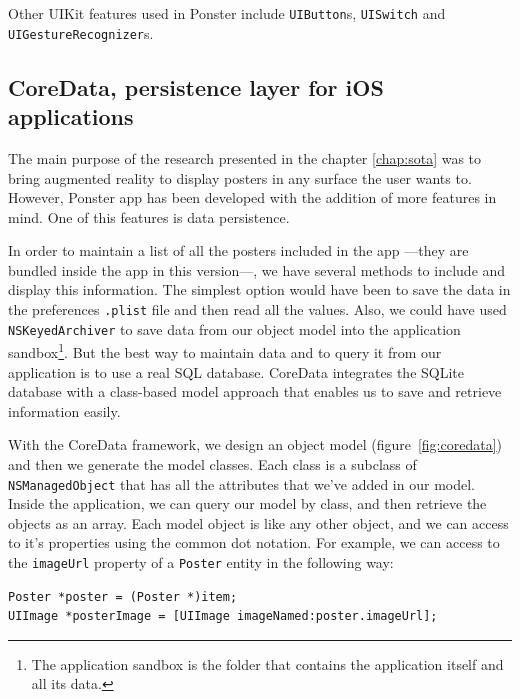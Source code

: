 Other UIKit features used in Ponster include \texttt{UIButton}s, \texttt{UISwitch}
and \texttt{UIGestureRecognizer}s. 

\subsection{CoreData, persistence layer for iOS applications}
The main purpose of the research presented in the chapter \ref{chap:sota} was to
bring augmented reality to display posters in any surface the user wants
to. However, Ponster app has been developed with the addition of more features in
mind. One of this features is data persistence.

In order to maintain a list of all the posters included in the app ---they are bundled
inside the app in this version---, we have several methods to include and display
this information. The simplest option would have been to save the data in the preferences
\texttt{.plist} file and then read all the values. Also, we could have used
\texttt{NSKeyedArchiver} to save data from our object model into the application
sandbox\footnote{The application sandbox is the folder that contains the application
itself and all its data.}. But the best way to maintain data and to
query it from our application is to use a real SQL database. CoreData integrates
the SQLite database with a class-based model approach that enables us to save and
retrieve information easily.

With the CoreData framework, we design an object model (figure~\ref{fig:coredata}) and then we
generate the model classes. Each class is a subclass of \texttt{NSManagedObject}
that has all the attributes that we've added in our model. Inside the application,
we can query our model by class, and then retrieve the objects as an array. Each
model object is like any other object, and we can access to it's properties using
the common dot notation. For example, we can access to the \texttt{imageUrl}
property of a \texttt{Poster} entity in the following way:

\begin{verbatim}
Poster *poster = (Poster *)item;
UIImage *posterImage = [UIImage imageNamed:poster.imageUrl];
\end{verbatim}

